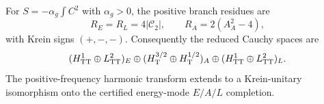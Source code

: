 \begin{theorem}
For $S=-\alpha_g\int C^2$ with $\alpha_g>0$, the positive
branch residues are
\[R_E=R_L=4|\mathcal C_2|,\qquad R_A=2(A_A^2-4),\]
with Krein signs $(+,-,-)$.  Consequently the reduced Cauchy
spaces are
\[(H^1_{\rm TT}\oplus L^2_{\rm TT})_E\oplus
(H^{3/2}_{\rm T}\oplus H^{1/2}_{\rm T})_A\oplus
(H^1_{\rm TT}\oplus L^2_{\rm TT})_L.\]
The positive-frequency harmonic transform extends to a
Krein-unitary isomorphism onto the certified energy-mode
$E/A/L$ completion.
\end{theorem}
